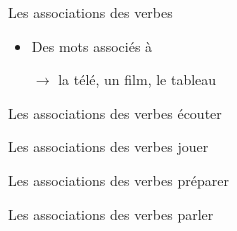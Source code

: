 \begin{frame}{Les associations des verbes }
  \centering
  \begin{itemize}
    \item Des mots associés à 
    \item[$\to$] la télé, un film, le tableau
    \item[] 
    \item[] 
  \end{itemize}
\end{frame}

\begin{frame}{Les associations des verbes }
  \centering
  écouter

\end{frame}

\begin{frame}{Les associations des verbes }
  \centering
  jouer

\end{frame}

\begin{frame}{Les associations des verbes }
  \centering
  préparer

\end{frame}

\begin{frame}{Les associations des verbes }
  \centering
  parler

\end{frame}



